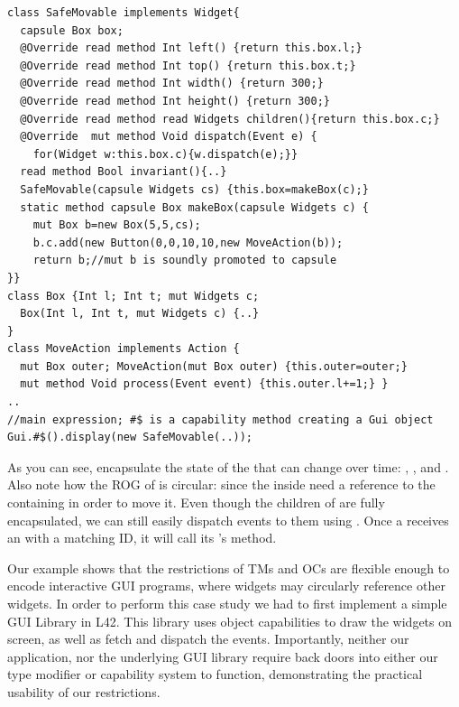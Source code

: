 \begin{lstlisting}[mathescape=false]
class SafeMovable implements Widget{
  capsule Box box;
  @Override read method Int left() {return this.box.l;}
  @Override read method Int top() {return this.box.t;}
  @Override read method Int width() {return 300;}
  @Override read method Int height() {return 300;}
  @Override read method read Widgets children(){return this.box.c;}
  @Override  mut method Void dispatch(Event e) {
    for(Widget w:this.box.c){w.dispatch(e);}}
  read method Bool invariant(){..}
  SafeMovable(capsule Widgets cs) {this.box=makeBox(c);}
  static method capsule Box makeBox(capsule Widgets c) {
    mut Box b=new Box(5,5,cs);
    b.c.add(new Button(0,0,10,10,new MoveAction(b));
    return b;//mut b is soundly promoted to capsule
}}
class Box {Int l; Int t; mut Widgets c;
  Box(Int l, Int t, mut Widgets c) {..}
}
class MoveAction implements Action {
  mut Box outer; MoveAction(mut Box outer) {this.outer=outer;}
  mut method Void process(Event event) {this.outer.l+=1;} }
..
//main expression; #$ is a capability method creating a Gui object
Gui.#$().display(new SafeMovable(..));
\end{lstlisting}\saveSpace
As you can see, \Q@Box@es encapsulate the state of the \Q@SafeMovable@s that can change over time:
\Q@left@, \Q@top@, and \Q@children@. Also note how the ROG of \Q@Box@ is circular: since
the \Q@MoveAction@s inside \Q@Button@s need a reference to the containing \Q@Box@ in order to move it.
Even though the children of \Q@SafeMovable@s are fully encapsulated, we can still easily dispatch events to them using \Q@dispatch@. Once a \Q@Button@ receives an \Q@Event@ with a matching ID, it will call its \Q@Action@'s \Q@process@ method. 

Our example shows that the restrictions of TMs and OCs are flexible enough to encode interactive GUI programs, where widgets may circularly reference other widgets.
In order to perform this case study we had to first implement a simple GUI Library in L42. This library uses object capabilities to draw the widgets on screen, as well as fetch and dispatch the events. Importantly, neither our application, nor the underlying GUI library require back doors into either our type modifier or capability system to function, demonstrating the practical usability of our restrictions.


